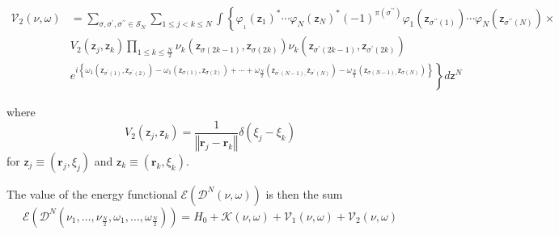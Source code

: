 \documentclass[aps,preprint]{revtex4}%
\begin{document}
\begin{align}
\mathcal{V}_{2}\left(  \nu,\omega\right)   &  =%
{\textstyle\sum\limits_{\sigma,\sigma^{\prime},\sigma^{\prime\prime}%
\in\mathcal{S}_{N}}}
{\displaystyle\sum\limits_{1\leq j<k\leq N}}
\int\left\{  \varphi_{_{1}}\left(  \mathsf{z}_{1}\right)  ^{\ast}\cdots
\varphi_{N}\left(  \mathsf{z}_{N}\right)  ^{\ast}\left(  -1\right)
^{\pi\left(  \sigma^{\prime\prime}\right)  }\varphi_{1}\left(  \mathsf{z}%
_{\sigma^{\prime\prime}\left(  1\right)  }\right)  \cdots\varphi_{N}\left(
\mathsf{z}_{\sigma^{\prime\prime}\left(  N\right)  }\right)  \right.
\times\nonumber\\
&  V_{2}\left(  \mathsf{z}_{j},\mathsf{z}_{k}\right)
{\displaystyle\prod\limits_{1\leq k\leq\frac{N}{2}}}
\nu_{k}\left(  \mathsf{z}_{\sigma\left(  2k-1\right)  },\mathsf{z}%
_{\sigma\left(  2k\right)  }\right)  \nu_{k}\left(  \mathsf{z}_{\sigma
^{\prime}\left(  2k-1\right)  },\mathsf{z}_{\sigma^{\prime}\left(  2k\right)
}\right) \nonumber\\
&  \left.  e^{i\left\{  \omega_{1}\left(  \mathsf{z}_{\sigma^{\prime}\left(
1\right)  },\mathsf{z}_{\sigma^{\prime}\left(  2\right)  }\right)  -\omega
_{1}\left(  \mathsf{z}_{\sigma\left(  1\right)  },\mathsf{z}_{\sigma\left(
2\right)  }\right)  +\cdots+\omega_{\frac{N}{2}}\left(  \mathsf{z}%
_{\sigma^{\prime}\left(  N-1\right)  ,}\mathsf{z}_{\sigma^{\prime}\left(
N\right)  }\right)  -\omega_{\frac{N}{2}}\left(  \mathsf{z}_{\sigma\left(
N-1\right)  ,}\mathsf{z}_{\sigma\left(  N\right)  }\right)  \right\}
}\right\}  d\mathsf{z}^{N}%
\end{align}


where%
\begin{equation}
V_{2}\left(  \mathsf{z}_{j},\mathsf{z}_{k}\right)  =\frac{1}{\left\Vert
\mathbf{r}_{j}-\mathbf{r}_{k}\right\Vert }\delta\left(  \xi_{j}-\xi
_{k}\right)
\end{equation}
for $\mathsf{z}_{j}\equiv\left(  \mathbf{r}_{j},\xi_{j}\right)  $ and
$\mathsf{z}_{k}\equiv\left(  \mathbf{r}_{k},\xi_{k}\right)  .$

The value of the energy functional $\mathcal{E}\left(  \mathcal{D}^{N}\left(
\nu,\omega\right)  \right)  $ is then the sum
\begin{equation}
\mathcal{E}\left(  \mathcal{D}^{N}\left(  \nu_{1},\ldots,\nu_{\frac{N}{2}%
},\omega_{1},\ldots,\omega_{\frac{N}{2}}\right)  \right)  =H_{0}%
+\mathcal{K}\left(  \nu,\omega\right)  +\mathcal{V}_{1}\left(  \nu
,\omega\right)  +\mathcal{V}_{2}\left(  \nu,\omega\right)
\end{equation}
\end{document}
